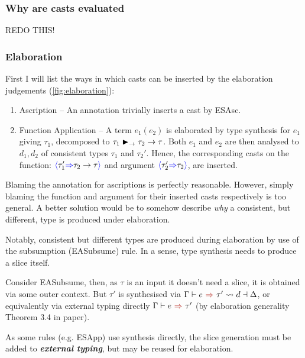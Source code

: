\subsubsection{Why are casts evaluated}
\newpage 
REDO THIS!
\subsubsection{Elaboration}
First I will list the ways in which casts can be inserted by the elaboration judgements (\ref{fig:elaboration}):
\begin{enumerate}
\item Ascription -- An annotation trivially inserts a cast by ESAsc.
\item Function Application -- A term $e_1(e_2)$ is elaborated by type synthesis for $e_1$ giving $\tau_1$, decomposed to $\tau_1 \blacktriangleright_\rightarrow \tau_2 \to \tau$. Both $e_1$ and $e_2$ are then analysed to $d_1, d_2$ of consistent types $\tau_1$ and $\tau_2'$. Hence, the corresponding casts on the function: ${\color{blue}\langle} \tau_1' {\color{blue}\Rightarrow} \tau_2 \to \tau {\color{blue}\rangle}$ and argument ${\color{blue}\langle} \tau_2' {\color{blue}\Rightarrow} \tau_2 {\color{blue}\rangle}$, are inserted.\par 
\end{enumerate}

Blaming the annotation for ascriptions is perfectly reasonable. However, simply blaming the function and argument for their inserted casts respectively is too general. A better solution would be to somehow describe \textit{why} a consistent, but different, type is produced under elaboration.\par 
Notably, consistent but different types are produced during elaboration by use of the subsumption (EASubsume) rule. In a sense, type synthesis needs to produce a slice itself.\par 
Consider EASubsume, then, as $\tau$ is an input it doesn't need a slice, it is obtained via some outer context. But $\tau'$ is synthesised via $\elaborationSynthesis{e}{\tau'}{d}{\Delta}$, or equivalently via external typing directly $\synthesis{e}{\tau'}$ (by elaboration generality Theorem 3.4 in paper).\par 
As some rules (e.g. ESApp) use synthesis directly, the slice generation must be added to \textit{\textbf{external typing}}, but may be reused for elaboration.

